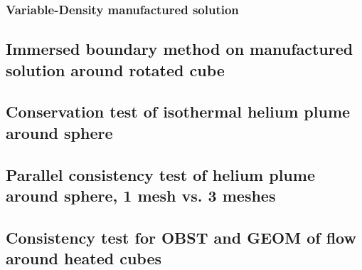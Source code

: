\documentclass[12pt]{article}
\begin{document}



\subsubsection{Variable-Density manufactured solution}






\subsection{Immersed boundary method on manufactured solution around rotated cube}





\subsection{Conservation test of isothermal helium plume around sphere}





\subsection{Parallel consistency test of helium plume around sphere, 1 mesh vs. 3 meshes}




\subsection{Consistency test for OBST and GEOM of flow around heated cubes}




\end{document}
